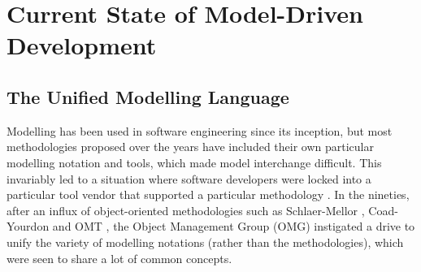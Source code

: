 \section{Current State of Model-Driven Development} \label{mda2mdd}

\subsection{The Unified Modelling Language} \label{uml}




Modelling has been used in software engineering since its inception, but most methodologies proposed over the years have included their own particular modelling notation and tools, which made model interchange difficult. This invariably led to a situation where software developers were locked into a particular tool vendor that supported a particular methodology \cite{umllrm}. In the nineties, after an influx of object-oriented methodologies such as Schlaer-Mellor \cite{schlaermellor}, Coad-Yourdon \cite{coadyourdon} and OMT \cite{omt}, the Object Management Group \cite{omg} (OMG) instigated a drive to unify the variety of modelling notations (rather than the methodologies), which were seen to share a lot of common concepts.

